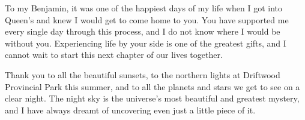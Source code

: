 To my Benjamin, it was one of the happiest days of my life when I got into Queen's and knew I would get to come home to you. You have supported me every single day through this process, and I do not know where I would be without you. Experiencing life by your side is one of the greatest gifts, and I cannot wait to start this next chapter of our lives together. 

Thank you to all the beautiful sunsets, to the northern lights at Driftwood Provincial Park this summer, and to all the planets and stars we get to see on a clear night. The night sky is the universe's most beautiful and greatest mystery, and I have always dreamt of uncovering even just a little piece of it. 
